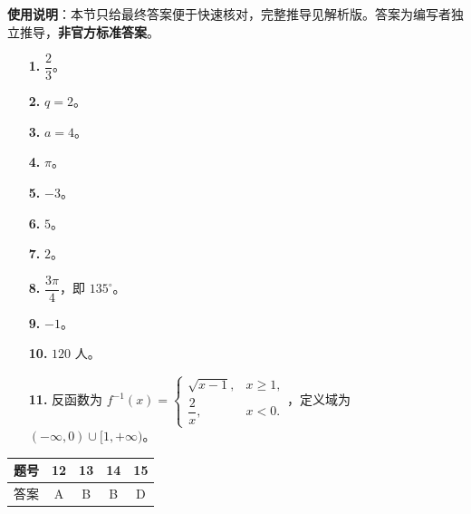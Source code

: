 
\begin{gknotice}
\textbf{使用说明}：本节只给最终答案便于快速核对，完整推导见解析版。答案为编写者独立推导，\textbf{非官方标准答案}。
\end{gknotice}

\begin{itemize}[leftmargin=2.6em]
  \item[\textbf{1.}] $\dfrac23$。
  \item[\textbf{2.}] $q=2$。
  \item[\textbf{3.}] $a=4$。
  \item[\textbf{4.}] $\pi$。
  \item[\textbf{5.}] $-3$。
  \item[\textbf{6.}] $5$。
  \item[\textbf{7.}] $2$。
  \item[\textbf{8.}] $\dfrac{3\pi}{4}$，即 $135^\circ$。
  \item[\textbf{9.}] $-1$。
  \item[\textbf{10.}] $120$ 人。
  \item[\textbf{11.}] 反函数为 $f^{-1}(x)=\begin{cases}\sqrt{x-1},&x\ge1,\\ \dfrac2x,&x<0.\end{cases}$，定义域为 $(-\infty,0)\cup[1,+\infty)$。
\end{itemize}

\begin{center}\begin{tabular}{ccccc}
\toprule
题号 & 12 & 13 & 14 & 15 \\
\midrule
答案 & A & B & B & D \\
\bottomrule
\end{tabular}\end{center}

